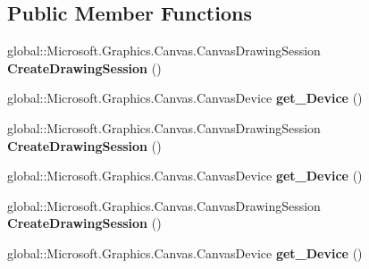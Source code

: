 \subsection*{Public Member Functions}
\begin{DoxyCompactItemize}
\item 
\mbox{\label{interface_microsoft_1_1_graphics_1_1_canvas_1_1_i_canvas_command_list_a4014c009705d90f8436b5970fe9514c3}} 
global\+::\+Microsoft.\+Graphics.\+Canvas.\+Canvas\+Drawing\+Session {\bfseries Create\+Drawing\+Session} ()
\item 
\mbox{\label{interface_microsoft_1_1_graphics_1_1_canvas_1_1_i_canvas_command_list_a8cc2c42c3b23be04878b00b778a7f60d}} 
global\+::\+Microsoft.\+Graphics.\+Canvas.\+Canvas\+Device {\bfseries get\+\_\+\+Device} ()
\item 
\mbox{\label{interface_microsoft_1_1_graphics_1_1_canvas_1_1_i_canvas_command_list_a4014c009705d90f8436b5970fe9514c3}} 
global\+::\+Microsoft.\+Graphics.\+Canvas.\+Canvas\+Drawing\+Session {\bfseries Create\+Drawing\+Session} ()
\item 
\mbox{\label{interface_microsoft_1_1_graphics_1_1_canvas_1_1_i_canvas_command_list_a8cc2c42c3b23be04878b00b778a7f60d}} 
global\+::\+Microsoft.\+Graphics.\+Canvas.\+Canvas\+Device {\bfseries get\+\_\+\+Device} ()
\item 
\mbox{\label{interface_microsoft_1_1_graphics_1_1_canvas_1_1_i_canvas_command_list_a4014c009705d90f8436b5970fe9514c3}} 
global\+::\+Microsoft.\+Graphics.\+Canvas.\+Canvas\+Drawing\+Session {\bfseries Create\+Drawing\+Session} ()
\item 
\mbox{\label{interface_microsoft_1_1_graphics_1_1_canvas_1_1_i_canvas_command_list_a8cc2c42c3b23be04878b00b778a7f60d}} 
global\+::\+Microsoft.\+Graphics.\+Canvas.\+Canvas\+Device {\bfseries get\+\_\+\+Device} ()
\item 

\end{DoxyCompactItemize}
